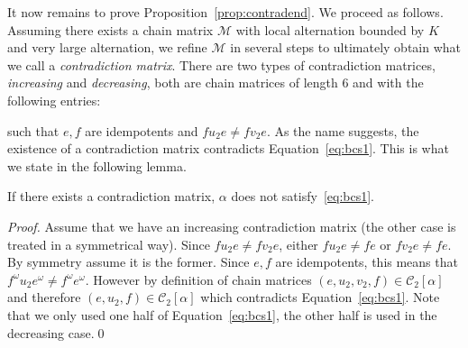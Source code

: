 \documentclass[envcountsame]{llncs}
\newcommand\Cs{\ensuremath{\mathcal{C}}\xspace}
\newcommand\Cstwo{\ensuremath{\Cs_2}\xspace}
\newcommand\mat{\ensuremath{\mathscr{M}}\xspace}
\newcommand\chain{chain\xspace}
\begin{document}
It now remains to prove Proposition~\ref{prop:contradend}. We proceed
as follows. Assuming there exists a \chain matrix \mat with local
alternation bounded by $K$ and very large alternation, we refine \mat
in several steps to ultimately obtain what we call a
\emph{contradiction matrix}. There are two types of contradiction
matrices, \emph{increasing} and \emph{decreasing}, both are
\chain matrices of length $6$ and with the following entries:

\begin{center}
\end{center}

\noindent
such that $e,f$ are idempotents and $fu_2e \neq fv_2e$. As the
name suggests, the existence of a contradiction matrix contradicts
Equation~\eqref{eq:bcs1}. This is what we state in the following
lemma.

\begin{lemma} \label{lem:contradmat}
  If there exists a contradiction matrix, $\alpha$ does not
  satisfy~\eqref{eq:bcs1}.
\end{lemma}

\begin{proof}
  Assume that we have an increasing contradiction matrix (the other case
  is treated in a symmetrical way). Since $fu_2e \neq fv_2e$, either
  $fu_2e \neq fe$ or $fv_2e \neq fe$. By symmetry assume it is the
  former. Since $e,f$ are idempotents, this means that $f^\omega u_2
  e^\omega \neq f^\omega e^\omega$. However by definition of \chain
  matrices $(e,u_2,v_2,f) \in \Cstwo[\alpha]$ and therefore  $(e,u_2,f)
  \in \Cstwo[\alpha]$ which contradicts Equation~\eqref{eq:bcs1}. Note 
  that we only used one half of Equation~\eqref{eq:bcs1}, the other half 
  is used in the decreasing case.\qed
\end{proof}
\end{document}
